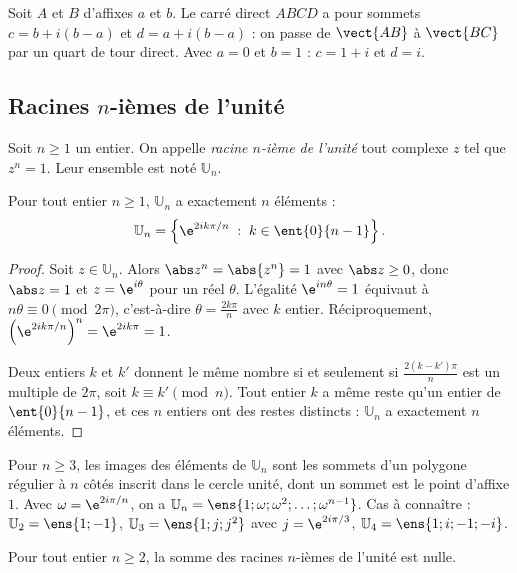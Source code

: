 \begin{example}
Soit $A$ et $B$ d'affixes $a$ et $b$. Le carré direct $ABCD$ a pour sommets $c=b+i(b-a)$ et $d=a+i(b-a)$ : on passe de $\vect{AB}$ à $\vect{BC}$ par un quart de tour direct. Avec $a=0$ et $b=1$ : $c=1+i$ et $d=i$.
\end{example}

\subsection{Racines $n$-ièmes de l'unité}
\begin{definition}
Soit $n\ge1$ un entier. On appelle \emph{racine $n$-ième de l'unité} tout complexe $z$ tel que $z^n=1$. Leur ensemble est noté $\mathbb U_n$.
\end{definition}
\begin{theorem}
Pour tout entier $n\ge1$, $\mathbb U_n$ a exactement $n$ éléments :
\[\mathbb U_n=\left\{\e^{2ik\pi/n}\;:\;k\in\ent{0}{n-1}\right\}.\]
\end{theorem}
\begin{proof}
Soit $z\in\mathbb U_n$. Alors $\abs z^n=\abs{z^n}=1$ avec $\abs z\ge0$, donc $\abs z=1$ et $z=\e^{i\theta}$ pour un réel $\theta$. L'égalité $\e^{in\theta}=1$ équivaut à $n\theta\equiv0\pmod{2\pi}$, c'est-à-dire $\theta=\frac{2k\pi}n$ avec $k$ entier. Réciproquement, $\left(\e^{2ik\pi/n}\right)^n=\e^{2ik\pi}=1$.\par
Deux entiers $k$ et $k'$ donnent le même nombre si et seulement si $\frac{2(k-k')\pi}{n}$ est un multiple de $2\pi$, soit $k\equiv k'\pmod n$. Tout entier $k$ a même reste qu'un entier de $\ent{0}{n-1}$, et ces $n$ entiers ont des restes distincts : $\mathbb U_n$ a exactement $n$ éléments.
\end{proof}
\begin{keypoint}
Pour $n\ge3$, les images des éléments de $\mathbb U_n$ sont les sommets d'un polygone régulier à $n$ côtés inscrit dans le cercle unité, dont un sommet est le point d'affixe $1$. Avec $\omega=\e^{2i\pi/n}$, on a $\mathbb U_n=\ens{1;\omega;\omega^2;\dots;\omega^{n-1}}$. Cas à connaître : $\mathbb U_2=\ens{1;-1}$, $\mathbb U_3=\ens{1;j;j^2}$ avec $j=\e^{2i\pi/3}$, $\mathbb U_4=\ens{1;i;-1;-i}$.
\end{keypoint}
\begin{theorem}
Pour tout entier $n\ge2$, la somme des racines $n$-ièmes de l'unité est nulle.
\end{theorem}
